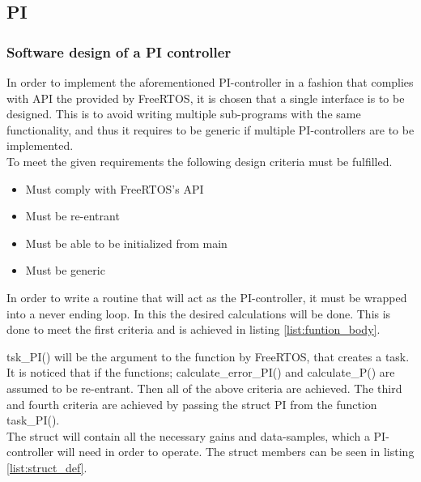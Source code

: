 \documentclass[../../../main]{subfiles}
\begin{document}
\subsection{PI}

\subsubsection{Software design of a PI controller}
In order to implement the aforementioned PI-controller in a fashion that complies with API the provided by FreeRTOS, it is chosen that a single interface is to be designed.
This is to avoid writing multiple sub-programs with the same functionality, and thus it requires to be generic if multiple PI-controllers are to be implemented.
\\

To meet the given requirements the following design criteria must be fulfilled.

\begin{itemize}

  \item Must comply with FreeRTOS's API
  \item Must be re-entrant
  \item Must be able to be initialized from main
  \item Must be generic
\end{itemize}

In order to write a routine that will act as the PI-controller, it must be wrapped into a never ending loop.
In this the desired calculations will be done. This is done to meet the first criteria and is achieved in listing \ref{list:funtion_body}.





tsk\_PI() will be the argument to the function by FreeRTOS, that creates a task.
It is noticed that if the functions; calculate\_error\_PI() and calculate\_P() are assumed to be re-entrant. Then all of the above criteria are achieved.
The third and fourth criteria are achieved by passing the struct PI from the function task\_PI().
\\

The struct will contain all the necessary gains and data-samples, which a PI-controller will need in order to operate.
The struct members can be seen in listing \ref{list:struct_def}.

\end{document}
